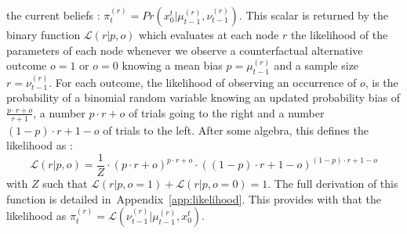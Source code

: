 \documentclass[12pt,english]{article}%
\newcommand{\eq}[1]{\begin{equation*}#1\end{equation*}}
\newcommand{\eql}[1]{\begin{equation}#1\end{equation}}
\newcommand{\Ll}{\mathcal{L}}
\newcommand{\seeApp}[1]{Appendix~\ref{app:#1}}
\begin{document}
the current beliefs : $\pi^{(r)}_t = Pr( x_0^{t} |  \mu^{(r)}_{t-1}, \nu^{(r)}_{t-1})$. %
This scalar is returned by the binary function 
$\Ll(r | p, o)$ which evaluates at each node $r$ the likelihood of the parameters of each node
whenever we observe a counterfactual alternative outcome $o=1$ or $o=0$
knowing a mean bias $p=\mu^{(r)}_{t-1}$
and a sample size $r=\nu^{(r)}_{t-1}$.
For each outcome, the likelihood of observing an occurrence of $o$,
is the probability of a binomial random variable knowing
an updated probability bias of $\frac{p \cdot r + o}{r+1}$,
a number $p \cdot r + o$ of trials going to the right and
a number $(1-p) \cdot r + 1 - o$ of trials to the left.
After some algebra, this defines the likelihood as :
\eql{
\Ll(r|p, o) = \frac{1}{Z} \cdot {(p \cdot r + o)}^{p \cdot r + o} \cdot {((1- p)\cdot r + 1- o)}^{(1- p)\cdot r + 1- o}
\label{eq:likelihood}
}
with $Z$ such that $\Ll(r|p, o=1) + \Ll(r|p, o=0)=1$. %
The full derivation of this function is detailed in~\seeApp{likelihood}.
This provides with that the likelihood as $\pi^{(r)}_t = \Ll(\nu^{(r)}_{t-1} | \mu^{(r)}_{t-1}, x_0^{t})$.
\end{document}

